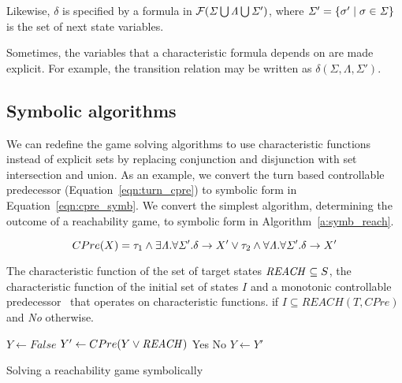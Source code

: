 Likewise, $\delta$ is specified by a formula in $\mathcal{F}(\mathit{\Sigma} \bigcup \mathit{\Lambda} \bigcup \mathit{\Sigma}')$, where $\mathit{\Sigma}' = \{\sigma' \mid \sigma \in \mathit{\Sigma} \}$ is the set of next state variables.

Sometimes, the variables that a characteristic formula depends on are made explicit. For example, the transition relation may be written as $\delta(\Sigma, \Lambda, \Sigma')$.

\subsection{Symbolic algorithms}

We can redefine the game solving algorithms to use characteristic functions instead of explicit sets by replacing conjunction and disjunction with set intersection and union. As an example, we convert the turn based controllable predecessor (Equation~\ref{eqn:turn_cpre}) to symbolic form in Equation~\ref{eqn:cpre_symb}. We convert the simplest algorithm, determining the outcome of a reachability game, to symbolic form in Algorithm~\ref{a:symb_reach}.

\begin{equation}
CPre(X) = \tau_1 \wedge \exists \mathit{\Lambda}. \forall \mathit{\Sigma}'. \delta \rightarrow X' \vee \tau_2 \wedge \forall \mathit{\Lambda}. \forall \mathit{\Sigma}'. \delta \rightarrow X' 
\label{eqn:cpre_symb}
\end{equation}

\begin{algorithm}
\begin{algorithmic}

\Require The characteristic function of the set of target states $\mathit{REACH} \subseteq S$, the characteristic function of the initial set of states $I$ and a monotonic controllable predecessor \cpre\ that operates on characteristic functions.
 if $I \subseteq REACH(T, CPre)$ and {\it No} otherwise.

    \State $Y \gets False$
    \Loop
        \State $Y' \gets CPre(Y \vee \mathit{REACH})$
                \State\Return Yes
            \Else
                \State\Return No
            \EndIf
        \EndIf
        \State $Y \gets Y'$
    \EndLoop
\EndFunction

\end{algorithmic}
\caption{Solving a reachability game symbolically}
\label{a:symb_reach}
\end{algorithm}

